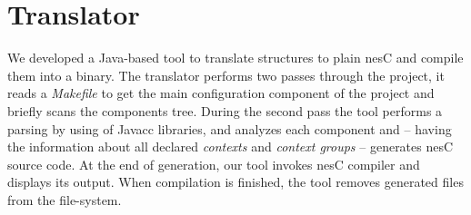 \section{Translator}

We developed a Java-based tool to translate \conesc structures to plain nesC and
compile them into a binary. The translator performs two passes through the
project, it reads a \emph{Makefile} to get the main configuration component of
the project and briefly scans the components tree. During the second pass the
tool performs a parsing by using of Javacc libraries, and analyzes each
component and -- having the information about all declared \emph{contexts} and
\emph{context groups} -- generates nesC source code. At the end of generation,
our tool invokes nesC compiler and displays its output. When compilation is
finished, the tool removes generated files from the file-system.



